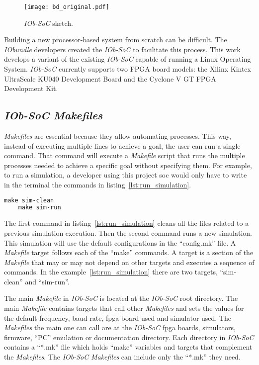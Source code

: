 \begin{figure}[!h]
    \centering
    \texttt{[image: bd\_original.pdf]}
    \caption{\textit{IOb-SoC} sketch.}
    \label{fig:bd_original}
\end{figure}

Building a new processor-based system from scratch can be difficult. The \textit{IObundle} developers created the \textit{IOb-SoC} to facilitate this process. This work develops a variant of the existing \textit{IOb-SoC} capable of running a Linux Operating System. \textit{IOb-SoC} currently supports two FPGA board models: the Xilinx Kintex UltraScale KU040 Development Board and the Cyclone V GT FPGA Development Kit.

\subsection{\textit{IOb-SoC} \textit{Makefiles}}
\textit{Makefiles} are essential because they allow automating processes. This way, instead of executing multiple lines to achieve a goal, the user can run a single command. That command will execute a \textit{Makefile} script that runs the multiple processes needed to achieve a specific goal without specifying them. For example, to run a simulation, a developer using this project \acrshort{soc} would only have to write in the terminal the commands in listing~\ref{lst:run_simulation}.

\begin{lstlisting}[language=make, caption={Run a simulation.}, label=lst:run_simulation]
    make sim-clean
    make sim-run
\end{lstlisting}

The first command in listing~\ref{lst:run_simulation} cleans all the files related to a previous simulation execution. Then the second command runs a new simulation. This simulation will use the default configurations in the \enquote{config.mk} file. A \textit{Makefile} target follows each of the \enquote{make} commands. A target is a section of the \textit{Makefile} that may or may not depend on other targets and executes a sequence of commands. In the example~\ref{lst:run_simulation} there are two targets, \enquote{sim-clean} and \enquote{sim-run}.

The main \textit{Makefile} in \textit{IOb-SoC} is located at the \textit{IOb-SoC} root directory. The main \textit{Makefile} contains targets that call other \textit{Makefiles} and sets the values for the default frequency, baud rate, \acrshort{fpga} board used and simulator used. The \textit{Makefiles} the main one can call are at the \textit{IOb-SoC} \acrshort{fpga} boards, simulators, firmware, \enquote{PC} emulation or documentation directory. Each directory in \textit{IOb-SoC} contains a \enquote{*.mk} file which holds \enquote{make} variables and targets that complement the \textit{Makefiles}. The \textit{IOb-SoC} \textit{Makefiles} can include only the \enquote{*.mk} they need.

